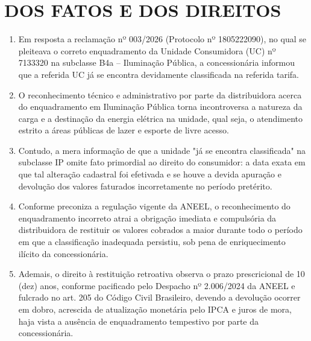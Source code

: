 \newcommand{\tipoRequerimento}{Cobrança indevida sobre enquadramento tarifário incorreto}
\section{DOS FATOS E DOS DIREITOS}


\begin{enumerate}
    \item Em resposta a reclamação nº 003/2026 (Protocolo nº 1805222090), no qual se pleiteava o correto enquadramento da Unidade Consumidora (UC) nº 7133320 na subclasse B4a -- Iluminação Pública, a concessionária informou que a referida UC já se encontra devidamente classificada na referida tarifa.
    
    \item O reconhecimento técnico e administrativo por parte da distribuidora acerca do enquadramento em Iluminação Pública torna incontroversa a natureza da carga e a destinação da energia elétrica na unidade, qual seja, o atendimento estrito a áreas públicas de lazer e esporte de livre acesso.
    
    \item Contudo, a mera informação de que a unidade "já se encontra classificada" na subclasse IP omite fato primordial ao direito do consumidor: a data exata em que tal alteração cadastral foi efetivada e se houve a devida apuração e devolução dos valores faturados incorretamente no período pretérito.
    
    \item Conforme preconiza a regulação vigente da ANEEL, o reconhecimento do enquadramento incorreto atrai a obrigação imediata e compulsória da distribuidora de restituir os valores cobrados a maior durante todo o período em que a classificação inadequada persistiu, sob pena de enriquecimento ilícito da concessionária.
    
    \item Ademais, o direito à restituição retroativa observa o prazo prescricional de 10 (dez) anos, conforme pacificado pelo Despacho nº 2.006/2024 da ANEEL e fulcrado no art. 205 do Código Civil Brasileiro, devendo a devolução ocorrer em dobro, acrescida de atualização monetária pelo IPCA e juros de mora, haja vista a ausência de enquadramento tempestivo por parte da concessionária.
\end{enumerate}

